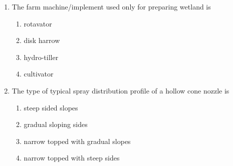 \documentclass[12pt]{article}
\begin{document}
\begin{enumerate}[label=Q.\arabic*]
		\item The farm machine/implement used only for preparing wetland is
			\begin{multicols}{4}
				\begin{enumerate}[label=(\Alph*)]
					\item rotavator
					\item disk harrow
					\item hydro-tiller
					\item cultivator
				\end{enumerate}
			\end{multicols}
		\item The type of typical spray distribution profile of a hollow cone nozzle is
			\begin{multicols}{2}
				\begin{enumerate}[label=(\Alph*)]
					\item steep sided slopes
					\item gradual sloping sides
					\item narrow topped with gradual slopes
					\item narrow topped with steep sides
				\end{enumerate}
			\end{multicols}


\end{enumerate}
\end{document}
